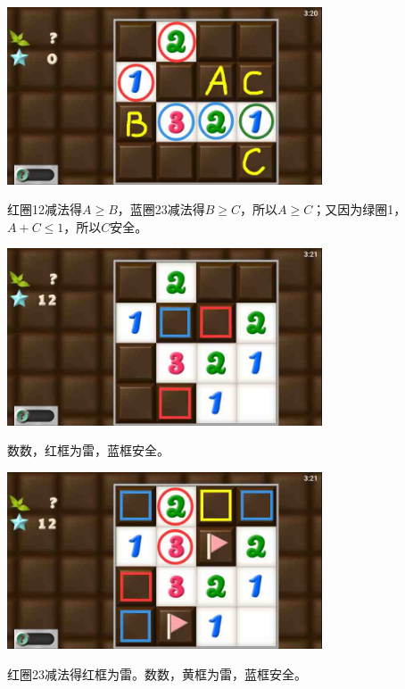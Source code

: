 \subsection{} %
\begin{center}
    \includegraphics[width=0.7\textwidth]{puzzlelow/156-1.jpg}
\end{center}
红圈12减法得$A\ge B$，蓝圈23减法得$B\ge C$，所以$A\ge C$；又因为绿圈1，$A+C\le 1$，所以$C$安全。
\begin{center}
    \includegraphics[width=0.7\textwidth]{puzzlelow/156-2.jpg}
\end{center}
数数，红框为雷，蓝框安全。
\begin{center}
    \includegraphics[width=0.7\textwidth]{puzzlelow/156-3.jpg}
\end{center}
红圈23减法得红框为雷。数数，黄框为雷，蓝框安全。

